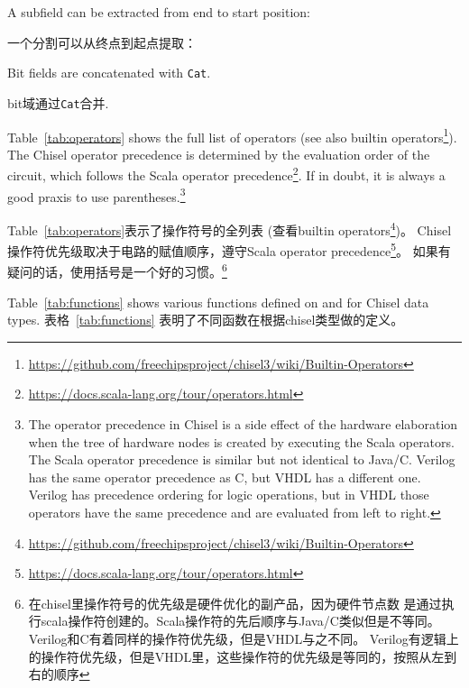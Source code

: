 \documentclass[%
    10pt,
    headinclude, footexclude,
    openright, %
    notitlepage,
    cleardoubleempty,
    headsepline,
    pointlessnumbers,
    bibtotoc, idxtotoc,
    ]{scrbook}
\newcommand{\code}[1]{{\small{\texttt{#1}}}}
\newcommand{\myref}[2]{\href{#1}{#2}}
\renewcommand{\myref}[2]{{#2}{\footnote{\url{#1}}}}
\begin{document}

\noindent A subfield can be extracted from end to start position:

\noindent 一个分割可以从终点到起点提取：


\noindent Bit fields are concatenated with \code{Cat}.

\noindent bit域通过\code{Cat}合并.


Table~\ref{tab:operators} shows the full list of operators
(see also \myref{https://github.com/freechipsproject/chisel3/wiki/Builtin-Operators}{builtin operators}).
The Chisel operator precedence is determined by the evaluation order of the circuit,
which follows the \myref{https://docs.scala-lang.org/tour/operators.html}{Scala operator precedence}.
If in doubt, it is always a good praxis to use parentheses.\footnote{The operator precedence in
Chisel is a side effect of the hardware elaboration when the tree of hardware nodes
is created by executing the Scala operators. The Scala operator precedence is similar but
not identical to Java/C. Verilog has the same operator precedence as C, but VHDL
has a different one. Verilog has precedence ordering for logic operations, but in VHDL
those operators have the same precedence and are evaluated from left to right.}

Table~\ref{tab:operators}表示了操作符号的全列表
(查看\myref{https://github.com/freechipsproject/chisel3/wiki/Builtin-Operators}{builtin operators})。
Chisel操作符优先级取决于电路的赋值顺序，遵守\myref{https://docs.scala-lang.org/tour/operators.html}{Scala operator precedence}。
如果有疑问的话，使用括号是一个好的习惯。\footnote{在chisel里操作符号的优先级是硬件优化的副产品，因为硬件节点数
是通过执行scala操作符创建的。Scala操作符的先后顺序与Java/C类似但是不等同。Verilog和C有着同样的操作符优先级，但是VHDL与之不同。
Verilog有逻辑上的操作符优先级，但是VHDL里，这些操作符的优先级是等同的，按照从左到右的顺序}


Table~\ref{tab:functions} shows various functions defined on and for Chisel data types.
表格~\ref{tab:functions} 表明了不同函数在根据chisel类型做的定义。
\end{document}
